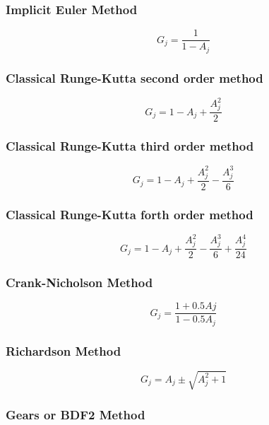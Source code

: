 \documentclass[fleqn]{article}
\begin{document}
\subsubsection*{Implicit Euler Method}
\begin{equation*}
G_j = \frac{1}{1 - A_j}
\end{equation*}

\subsubsection*{Classical Runge-Kutta second order method}
\begin{equation*}
G_j = 1 - A_j + \frac{A_j^2}{2}
\end{equation*}

\subsubsection*{Classical Runge-Kutta third order method}
\begin{equation*}
G_j = 1 - A_j + \frac{A_j^2}{2} - \frac{A_j^3}{6}
\end{equation*}

\subsubsection*{Classical Runge-Kutta forth order method}
\begin{equation*}
G_j = 1 - A_j + \frac{A_j^2}{2} - \frac{A_j^3}{6} + \frac{A_j^4}{24}
\end{equation*}

\subsubsection*{Crank-Nicholson Method}
\begin{equation*}
G_j = \frac{1+0.5Aj}{1 - 0.5A_j}
\end{equation*}

\subsubsection*{Richardson Method}
\begin{equation*}
G_j = A_j \pm \sqrt{A_j^2 + 1}
\end{equation*}

\subsubsection*{Gears or BDF2 Method}
\end{document}
